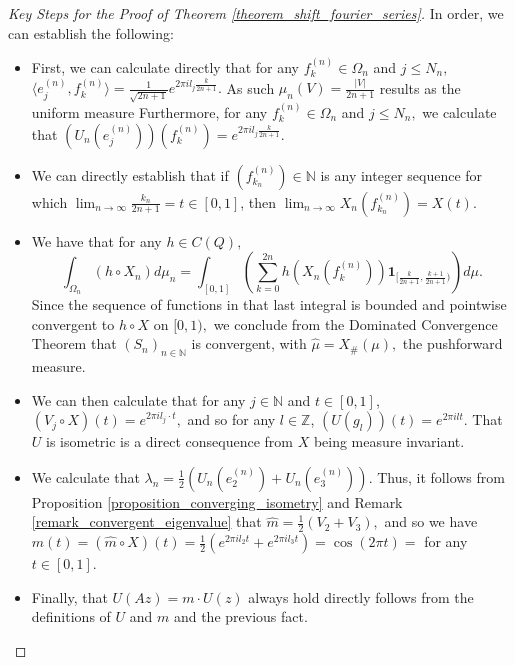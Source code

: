 \documentclass[10pt,a4paper]{amsart}
\def \HMU{\hat{\mu}}
\def \Hm{\hat{m}}
\def \LL{\langle}
\def \RR{\rangle}
\begin{document}
\begin{proof}[Key Steps for the Proof of Theorem \ref{theorem_shift_fourier_series}]
	In order, we can establish the following:
	\begin{itemize}
		\item First, we can calculate directly that for any $f_k^{(n)}\in \Omega_n$ and $j\leq N_n,$ $\LL e_j^{(n)}, f_k^{(n)} \RR= \frac{1}{\sqrt{2n+1}}e^{2\pi i l_j\frac{k}{2n+1}}.$ As such $\mu_n(V)=\frac{|V|}{2n+1}$ results as the uniform measure  Furthermore, for any $f_k^{(n)}\in\Omega_n$ and $j\leq N_n,$ we calculate that $(U_n(e_j^{(n)}))(f_k^{(n)})=e^{2\pi i l_j \frac{k}{2n+1}}$.
		\item We can directly establish that if $(f_{k_n}^{(n)})\in\mathbb{N}$ is any integer sequence for which $\lim_{n\rightarrow\infty} \frac{k_n}{2n+1}=t\in[0,1]$, then $\lim_{n\rightarrow\infty} X_n(f_{k_n}^{(n)})= X(t).$
		\item We have that for any $h\in C(Q),$ $$\int_{\Omega_n}(h\circ X_n)d\mu_n=\int_{[0,1]}\left(\sum_{k=0}^{2n}h(X_n(f_k^{(n)}))\mathbf{1}_{[\frac{k}{2n+1},\frac{k+1}{2n+1})}\right)d\mu.$$ Since the sequence of functions in that last integral is bounded and pointwise convergent to $h\circ X$ on $[0,1),$ we conclude from the Dominated Convergence Theorem that $(S_n)_{n\in\mathbb{N}}$ is convergent, with $\HMU=X_{\#}(\mu),$ the pushforward measure.
		\item We can then calculate that for any $j\in\mathbb{N}$ and $t\in [0,1]$, $(V_j\circ X)(t)=e^{2\pi i l_j\cdot t},$ and so for any $l\in\mathbb{Z}$, $(U(g_l))(t)=e^{2\pi i l t}.$ That $U$ is isometric is a direct consequence from $X$ being measure invariant.
		\item We calculate that $\lambda_n=\frac{1}{2}\left(U_n(e_2^{(n)})+U_n(e_3^{(n)})\right).$ Thus, it follows from Proposition \ref{proposition_converging_isometry} and Remark \ref{remark_convergent_eigenvalue} that $\Hm= \frac{1}{2}\left(V_2+V_3\right),$ and so we have $m(t)=(\Hm\circ X)(t)=\frac{1}{2}\left(e^{2\pi i l_2 t}+e^{2\pi i l_3 t}\right)=\cos(2\pi t)=$ for any $t\in [0,1].$
		\item Finally, that $U(Az)=m\cdot U(z)$ always hold directly follows from the definitions of $U$ and $m$ and the previous fact.
	\end{itemize}
\end{proof}
\end{document}
